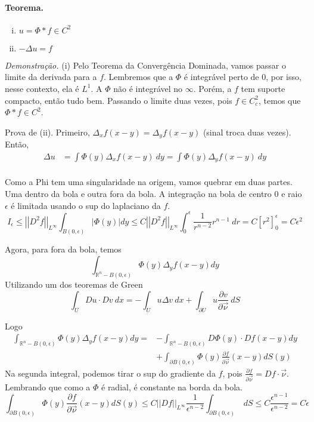 \documentclass[11pt]{article}
\newcommand{\p}{\partial}
\newcommand{\e}{\epsilon}
\newcommand{\pde}[2]{\frac{\p #1}{\p #2}}
\newcommand{\dirdev}[1]{\pde{#1}{\vec{\nu}}}
\newcommand{\norm}[2]{\left|\left|#1\right|\right|_{L^{#2}}}
\begin{document}
\paragraph{Teorema.}\begin{enumerate}[(i)]
	\item \(u=\Phi* f \in C^2\)
	\item \(-\Delta u =f\)
\end{enumerate}

\textit{Demonstração.} (i) Pelo Teorema da Convergência Dominada, vamos passar o limite da derivada para a \(f\). Lembremos que a \(\Phi\) é integrável perto de 0, por isso, nesse contexto, ela é \(L^1\). A \(\Phi\) não é integrável no \(\infty\). Porém, a \(f\) tem suporte compacto, então tudo bem. Passando o limite duas vezes, pois \(f \in C^2_c\), temos que \(\Phi * f \in C^2\).

Prova de (ii). Primeiro, \(\Delta_xf(x-y)=\Delta_yf(x-y)\) (sinal troca duas vezes). Então, \begin{align*}
	\Delta u &= \int \Phi(y) \Delta_x f(x-y)\ dy = \int \Phi(y) \Delta_y f(x-y)\ dy\\
\end{align*}

Como a Phi tem uma singularidade na origem, vamos quebrar em duas partes. Uma dentro da bola e outra fora da bola. A integração na bola de centro 0 e raio \(\e\) é limitada usando o sup do laplaciano da \(f\). 
\[ I_\epsilon \leq \norm{D^2 f}{\infty} \int_{ B(0,\epsilon) } | \Phi (y) | dy \leq C \norm{D^2 f}{\infty} \int_0^\e \frac{1}{r^{n-2}}r^{n-1}\ dr = C \left[ r^2\right]_0^\e = C\e^2\]

Agora, para fora da bola, temos
\[ \int_{\mathbb{R}^n - B(0, \epsilon)} \Phi (y) \Delta_y f(x-y) dy \]
Utilizando um dos teoremas de Green \[\int_U Du\cdot Dv\ dx = -\int_U u \Delta v\ dx + \int_{\p U} u \dirdev{v}\ dS\]

Logo \begin{align*}
	\int_{\mathbb{R}^n - B(0, \epsilon)} \Phi (y) \Delta_y f(x-y) dy = &- \int_{\mathbb{R}^n - B(0, \epsilon)} D \Phi (y)\cdot D f(x-y) dy\\ &+ \int_{\partial B(0, \epsilon)} \Phi(y) \dirdev{f}(x-y) dS(y) 
\end{align*} 
Na segunda integral, podemos tirar o sup do gradiente da \(f\), pois \(\dirdev{f}=Df \cdot \vec{\nu}\). Lembrando que como a \(\Phi\) é radial, é constante na borda da bola.
\[\int_{\partial B(0, \epsilon)} \Phi(y) \dirdev{f}(x-y) dS(y) \leq C \norm{Df}{\infty} \frac{1}{\e^{n-2}} \int_{\partial B(0, \epsilon)}\ dS \leq  C \frac{\e^{n-1}}{\e^{n-2}}= C\e \]
\end{document}
